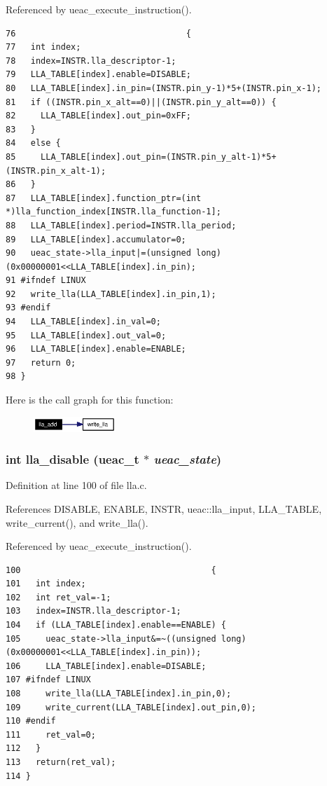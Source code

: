 Referenced by ueac\_\-execute\_\-instruction().

\footnotesize\begin{verbatim}76                                  {
77   int index;
78   index=INSTR.lla_descriptor-1;
79   LLA_TABLE[index].enable=DISABLE;
80   LLA_TABLE[index].in_pin=(INSTR.pin_y-1)*5+(INSTR.pin_x-1);
81   if ((INSTR.pin_x_alt==0)||(INSTR.pin_y_alt==0)) {
82     LLA_TABLE[index].out_pin=0xFF;
83   }
84   else {
85     LLA_TABLE[index].out_pin=(INSTR.pin_y_alt-1)*5+(INSTR.pin_x_alt-1);
86   }
87   LLA_TABLE[index].function_ptr=(int *)lla_function_index[INSTR.lla_function-1];
88   LLA_TABLE[index].period=INSTR.lla_period;
89   LLA_TABLE[index].accumulator=0;
90   ueac_state->lla_input|=(unsigned long)(0x00000001<<LLA_TABLE[index].in_pin);
91 #ifndef LINUX 
92   write_lla(LLA_TABLE[index].in_pin,1);
93 #endif 
94   LLA_TABLE[index].in_val=0;
95   LLA_TABLE[index].out_val=0;
96   LLA_TABLE[index].enable=ENABLE;
97   return 0;
98 }
\end{verbatim}\normalsize 




Here is the call graph for this function:\begin{figure}[H]
\begin{center}
\leavevmode
\includegraphics[width=88pt]{lla_8c_a6_cgraph}
\end{center}
\end{figure}
\subsubsection{\setlength{\rightskip}{0pt plus 5cm}int lla\_\-disable ({\bf ueac\_\-t} $\ast$ {\em ueac\_\-state})}\label{lla_8c_a7}




Definition at line 100 of file lla.c.

References DISABLE, ENABLE, INSTR, ueac::lla\_\-input, LLA\_\-TABLE, write\_\-current(), and write\_\-lla().

Referenced by ueac\_\-execute\_\-instruction().

\footnotesize\begin{verbatim}100                                      {
101   int index;
102   int ret_val=-1;
103   index=INSTR.lla_descriptor-1;
104   if (LLA_TABLE[index].enable==ENABLE) {
105     ueac_state->lla_input&=~((unsigned long)(0x00000001<<LLA_TABLE[index].in_pin));
106     LLA_TABLE[index].enable=DISABLE;
107 #ifndef LINUX    
108     write_lla(LLA_TABLE[index].in_pin,0);
109     write_current(LLA_TABLE[index].out_pin,0);
110 #endif 
111     ret_val=0;
112   }
113   return(ret_val);
114 }
\end{verbatim}\normalsize 




